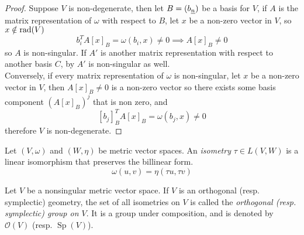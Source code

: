 \documentclass[../main-manifolds.tex]{subfiles}
\begin{document}
    \begin{proof}
        Suppose $V$ is non-degenerate, then let $B = (\Ul{b}[n])$ be a basis for $V$, if $A$ is the matrix representation of $\omega$ with respect to $B$, let $x$ be a non-zero vector in $V$, so $x\notin \operatorname{rad}({V})$
        \[
            b_i^T A [x]_B = \omega(b_i, x)\neq 0\implies A[x]_B\neq 0
        \]
        so $A$ is non-singular. If $A'$ is another matrix representation with respect to another basis $C$, by  $A'$ is non-singular as well.\\

        Conversely, if every matrix representation of $\omega$ is non-singular, let $x$ be a non-zero vector in $V$, then $A[x]_B\neq 0$ is a non-zero vector so there exists some basis component  $(A[x]_B)^j$ that is non zero, and
        \[
            [b_j]_B^TA[x]_B = \omega(b_j,x)\neq 0
        \]
        therefore $V$ is non-degenerate.
    \end{proof}
    

\begin{definition}
    Let $(V,\omega)$ and $(W, \eta)$ be metric vector spaces. An \emph{isometry} $\tau\in L(V,W)$ is a linear isomorphism that preserves the billinear form.
    \[
        \omega(u,v) = \eta(\tau u, \tau v)
    \]
\end{definition}
\begin{definition}
    Let $V$ be a nonsingular metric vector space. If $V$ is an orthogonal (resp. symplectic) geometry, the set of all isometries on $V$ is called the \emph{orthogonal (resp. symplectic) group on $V$}. It is a group under composition, and is denoted by $\mathcal{O}(V)$ (resp. $\operatorname{Sp}(V)$).
\end{definition}

\end{document}
